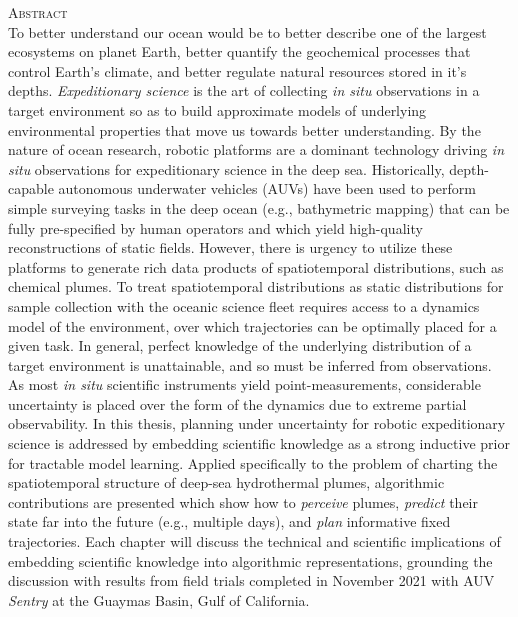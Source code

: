     \begin{singlespace}
    {\parindent0pt 
        {\large \textsc{Abstract}} \\ %

        To better understand our ocean would be to better describe one of the largest ecosystems on planet Earth, better quantify the geochemical processes that control Earth's climate, and better regulate natural resources stored in it's depths.
        \emph{Expeditionary science} is the art of collecting \emph{in situ} observations in a target environment so as to build approximate models of underlying environmental properties that move us towards better understanding.
        By the nature of ocean research, robotic platforms are a dominant technology driving \emph{in situ} observations for expeditionary science in the deep sea.
        Historically, depth-capable autonomous underwater vehicles (AUVs) have been used to perform simple surveying tasks in the deep ocean (e.g., bathymetric mapping) that can be fully pre-specified by human operators and which yield high-quality reconstructions of static fields.
        However, there is urgency to utilize these platforms to generate rich data products of spatiotemporal distributions, such as chemical plumes.
        To treat spatiotemporal distributions as static distributions for sample collection with the oceanic science fleet requires access to a dynamics model of the environment, over which trajectories can be optimally placed for a given task.
        In general, perfect knowledge of the underlying distribution of a target environment is unattainable, and so must be inferred from observations.
        As most \emph{in situ} scientific instruments yield point-measurements, considerable uncertainty is placed over the form of the dynamics due to extreme partial observability.
        In this thesis, planning under uncertainty for robotic expeditionary science is addressed by embedding scientific knowledge as a strong inductive prior for tractable model learning.
        Applied specifically to the problem of charting the spatiotemporal structure of deep-sea hydrothermal plumes, algorithmic contributions are presented which show how to \emph{perceive} plumes, \emph{predict} their state far into the future (e.g., multiple days), and \emph{plan} informative fixed trajectories.
        Each chapter will discuss the technical and scientific implications of embedding scientific knowledge into algorithmic representations, grounding the discussion with results from field trials completed in November 2021 with AUV \emph{Sentry} at the Guaymas Basin, Gulf of California.\\ 
        
}
\end{singlespace}

